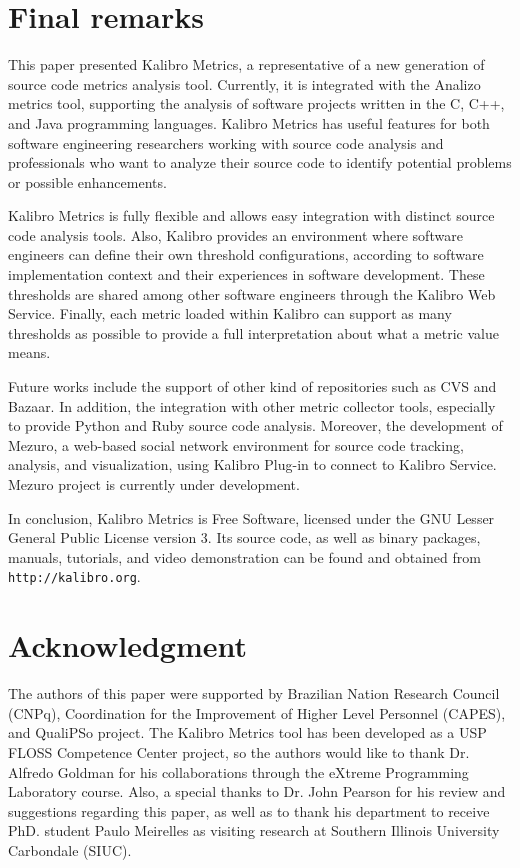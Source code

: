 \section{Final remarks}
\label{sec:final-remarkds}

This paper presented Kalibro Metrics, a representative of a new generation of
source code metrics analysis tool.
%
Currently, it is integrated with the Analizo metrics tool, supporting the
analysis of software projects written in the C, C++, and Java programming languages.
% 
Kalibro Metrics has useful features for both software engineering researchers
working with source code analysis and professionals who want to analyze their
source code to identify potential problems or possible enhancements.

Kalibro Metrics is fully flexible and allows easy integration with distinct
source code analysis tools.
%
Also, Kalibro provides an environment where software engineers
can define their own threshold configurations, according to software
implementation context and their experiences in software development.
%
These thresholds are shared among other software engineers through the Kalibro
Web Service.
%
Finally, each metric loaded within Kalibro can support as many thresholds as
possible to provide a full interpretation about what a metric value means.

Future works include the support of other kind of repositories such as
CVS and Bazaar.
%
In addition, the integration with other metric collector tools, especially
to provide Python and Ruby source code analysis.
%
Moreover, the development of Mezuro, a web-based social network environment
for source code tracking, analysis, and visualization, using Kalibro Plug-in
to connect to Kalibro Service.
%
Mezuro project is currently under development.

In conclusion, Kalibro Metrics is Free Software, licensed under the GNU Lesser
General Public License version 3. 
%
Its source code, as well as binary packages, manuals, tutorials,
and video demonstration can be found and obtained from \verb|http://kalibro.org|.

\section*{Acknowledgment}

The authors of this paper were supported by Brazilian Nation Research Council
(CNPq),  Coordination for the Improvement of Higher Level Personnel (CAPES),
and QualiPSo project.
%
The Kalibro Metrics tool has been developed as a USP FLOSS Competence
Center project, so the authors would like to thank Dr. Alfredo Goldman
for his collaborations through the eXtreme Programming Laboratory course.
%
Also, a special thanks to Dr. John Pearson for his review and
suggestions regarding this paper, as well as to thank his department to receive
PhD. student Paulo Meirelles as visiting research at Southern Illinois
University Carbondale (SIUC).
